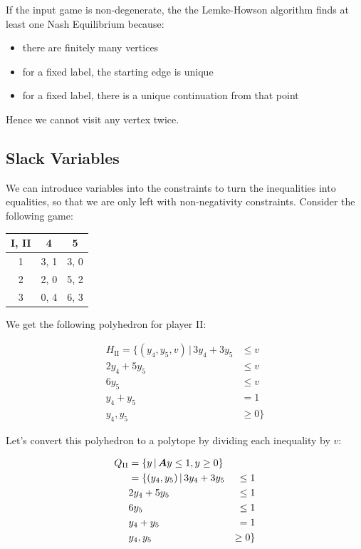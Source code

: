 If the input game is non-degenerate, the the Lemke-Howson algorithm finds at
least one Nash Equilibrium because:

\begin{itemize}
	\item there are finitely many vertices
	\item for a fixed label, the starting edge is unique
	\item for a fixed label, there is a unique continuation from that point
\end{itemize}

Hence we cannot visit any vertex twice.

\subsection{Slack Variables}

We can introduce variables into the constraints to turn the inequalities into
equalities, so that we are only left with non-negativity constraints. Consider
the following game:

\begin{center}
	\begin{tabular}{|c|c|c|}
		\hline
		\textbf{I}, \textbf{II} & 4 & 5 \\ \hline
		1 & 3, 1 & 3, 0 \\ \hline
		2 & 2, 0 & 5, 2 \\ \hline
		3 & 0, 4 & 6, 3 \\ \hline
	\end{tabular}
\end{center}

We get the following polyhedron for player II:

\begin{equation*}
	\begin{split}
		H_\text{II} = \{ (y_4, y_5, v) \, | \, 3y_4 + 3y_5 & \le v \\
		2y_4 + 5y_5 & \le v \\
		6y_5 & \le v \\
		y_4 + y_5 & = 1 \\
		y_4, y_5 & \ge 0 \}
	\end{split}
\end{equation*}

Let's convert this polyhedron to a polytope by dividing each inequality by $v$:

\begin{alignat}{2}
	Q_\text{II} & = \{ y \, | \, \bm{A}y \le 1, y \ge 0 \} \\
	& = \{ (y_4, y_5) \, | \, 3y_4 + 3y_5 & \le 1 \\
	& 2y_4 + 5y_5 & \le 1 \\
	& 6y_5 & \le 1 \\
	& y_4 + y_5 & = 1 \\
	& y_4, y_5 & \ge 0 \}
\end{alignat}

